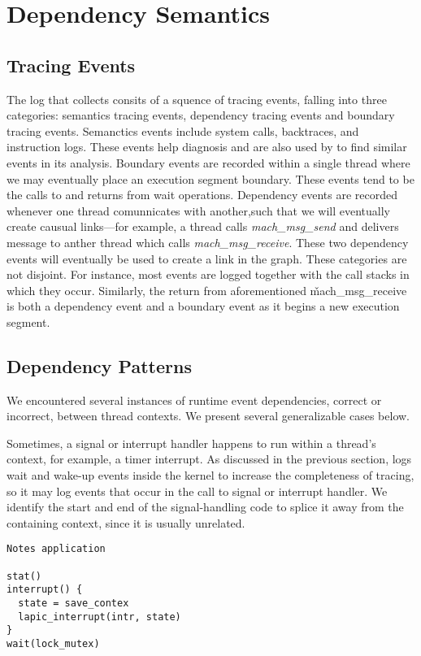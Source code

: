 \section{Dependency Semantics}
\subsection{Tracing Events}
The log that \xxx collects consits of a squence of tracing events, falling into three categories:
semantics tracing events, dependency tracing events and boundary tracing events.
Semanctics events include system calls, backtraces, and instruction logs.  These events help diagnosis and are also used by \xxx to find similar events in its analysis.
Boundary events are recorded within a single thread where we may eventually place an execution segment boundary.  These events tend to be the calls to and returns from wait operations.
Dependency events are recorded whenever one thread comunnicates with another,such that we will eventually create causual links---for example, a thread calls \textit{mach\_msg\_send} and delivers message to anther thread which calls \textit{mach\_msg\_receive}. These two dependency events will eventually be used to create a link in the graph.  These categories are not disjoint.  For instance, most events are logged together with the call stacks in which they occur.  Similarly, the return from aforementioned \v{mach\_msg\_receive} is both a dependency event and a boundary event as it begins a new execution segment.

\subsection{Dependency Patterns}
\label{sec:patterns}

We encountered several instances of runtime event dependencies, correct or incorrect, between thread
contexts. We present several generalizable cases below.

Sometimes, a signal or interrupt handler happens to run within a thread's context, for
example, a timer interrupt.  As discussed in the previous section, \xxx logs wait and wake-up events inside the kernel to increase the completeness of tracing, so it may log events that occur in the call to signal or interrupt handler.  We identify the start and end of the
signal-handling code to splice it away from the containing context, since it is
usually unrelated.


{\footnotesize \begin{verbatim}
Notes application

stat()
interrupt() {
  state = save_contex  
  lapic_interrupt(intr, state)
}
wait(lock_mutex)


\end{verbatim}
}

